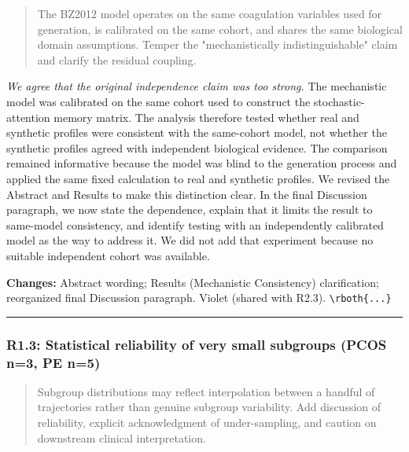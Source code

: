 \documentclass[
  11pt,
  letterpaper,
]{article}
\begin{document}
\begin{quote}
The BZ2012 model operates on the same coagulation variables used for generation, is calibrated on the same cohort, and shares the same biological domain assumptions. Temper the "mechanistically indistinguishable" claim and clarify the residual coupling.
\end{quote}

\emph{We agree that the original independence claim was too strong.} The mechanistic model was calibrated on the same cohort used to construct the stochastic-attention memory matrix. The analysis therefore tested whether real and synthetic profiles were consistent with the same-cohort model, not whether the synthetic profiles agreed with independent biological evidence. The comparison remained informative because the model was blind to the generation process and applied the same fixed calculation to real and synthetic profiles. We revised the Abstract and Results to make this distinction clear. In the final Discussion paragraph, we now state the dependence, explain that it limits the result to same-model consistency, and identify testing with an independently calibrated model as the way to address it. We did not add that experiment because no suitable independent cohort was available.

\textbf{Changes:} Abstract wording; Results (Mechanistic Consistency) clarification; reorganized final Discussion paragraph. Violet (shared with R2.3). \texttt{\textbackslash{}rboth\{...\}}

\begin{center}\rule{0.5\linewidth}{0.5pt}\end{center}

\subsubsection{R1.3: Statistical reliability of very small subgroups (PCOS n=3, PE n=5)}\label{r13-statistical-reliability-of-very-small-subgroups-pcos-n3-pe-n5}

\begin{quote}
Subgroup distributions may reflect interpolation between a handful of trajectories rather than genuine subgroup variability. Add discussion of reliability, explicit acknowledgment of under-sampling, and caution on downstream clinical interpretation.
\end{quote}
\end{document}
